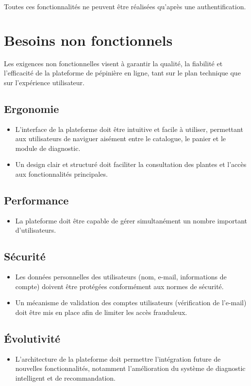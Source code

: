 Toutes ces fonctionnalités ne peuvent être réalisées qu'après une authentification.

\section{Besoins non fonctionnels}

Les exigences non fonctionnelles visent à garantir la qualité, la fiabilité et l'efficacité de la plateforme de pépinière en ligne, tant sur le plan technique que sur l'expérience utilisateur.

\subsection*{Ergonomie}
\begin{itemize}
    \item L'interface de la plateforme doit être intuitive et facile à utiliser, permettant aux utilisateurs de naviguer aisément entre le catalogue, le panier et le module de diagnostic.
    \item Un design clair et structuré doit faciliter la consultation des plantes et l'accès aux fonctionnalités principales.
\end{itemize}

\subsection*{Performance}
\begin{itemize}
    \item La plateforme doit être capable de gérer simultanément un nombre important d'utilisateurs.
\end{itemize}

\subsection*{Sécurité}
\begin{itemize}
    \item Les données personnelles des utilisateurs (nom, e-mail, informations de compte) doivent être protégées conformément aux normes de sécurité.
    \item Un mécanisme de validation des comptes utilisateurs (vérification de l'e-mail) doit être mis en place afin de limiter les accès frauduleux.
\end{itemize}

\subsection*{Évolutivité}
\begin{itemize}
    \item L'architecture de la plateforme doit permettre l'intégration future de nouvelles fonctionnalités, notamment l'amélioration du système de diagnostic intelligent et de recommandation.
\end{itemize}

